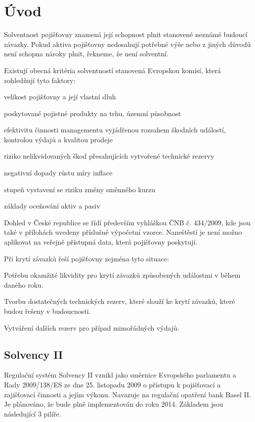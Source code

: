 \documentclass[12pt,oneside]{fithesis}
\begin{document}
\FrontMatter
\ThesisTitlePage


\MainMatter
\tableofcontents
\chapter{Úvod}
Solventnost pojišťovny znamená její schopnost plnit stanovené neznámé budoucí závazky. Pokud aktiva pojišťovny nedosahují potřebné výše nebo z jiných důvodů není schopna nároky plnit, řekneme, že není solventní.

Existují obecná kritéria solventností stanovená Evropskou komisí, která zohledňují tyto faktory:
\begin{compactitem}
\item velikost pojišťovny a její vlastní dluh
\item poskytované pojistné produkty na trhu, územní působnost
\item efektivitu činnosti managementu vyjádřenou rozsahem
škodních událostí, kontrolou výdajů a kvalitou prodeje
\item riziko nelikvidovaných škod přesahujících vytvořené technické
rezervy
\item negativní dopady růstu míry inflace
\item stupeň vystavení se riziku změny směnného kurzu
\item základy oceňování aktiv a pasiv
\end{compactitem}
Dohled v České republice se řídí především vyhláškou ČNB č. 434/2009, kde jsou také v přílohách uvedeny příslušné výpočetní vzorce. Naneštěstí je není možno aplikovat na veřejně přístupná data, která pojišťovny poskytují. 

Při krytí závazků řeší pojišťovny zejména tyto situace:
\begin{compactitem}
\item Potřebu okamžité likvidity pro krytí závazků způsobených událostmi v během daného roku.
\item Tvorbu dostatečných technických rezerv, které slouží ke krytí závazků, které budou řešeny v budoucnosti.
\item Vytváření dalších rezerv pro případ mimořádných výdajů.
\end{compactitem}
\section{Solvency II}
Regulační systém Solvency II vznikl jako směrnice Evropského parlamentu a Rady 2009/138/ES ze dne 25. listopadu 2009 o přístupu k pojišťovací a zajišťovací činnosti a jejím výkonu. Navazuje na regulační opatření bank Basel II. Je plánováno, že bude plně implementován do roku 2014. Základem jsou následující 3 pilíře.
\end{document}
